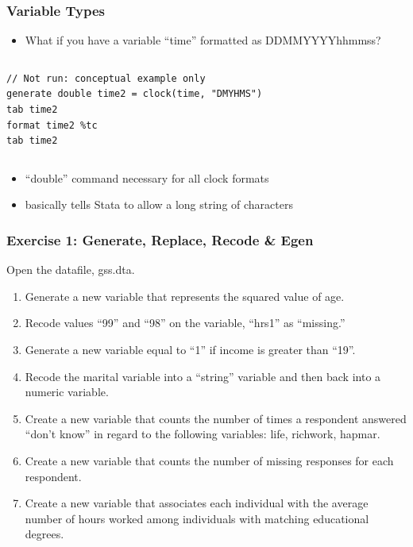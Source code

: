 \documentclass[table]{beamer}
\begin{document}
\begin{frame}[fragile]
\frametitle{Variable Types}
\label{sec-5-8}

\begin{itemize}
\item What if you have a variable ``time'' formatted as DDMMYYYYhhmmss?
\end{itemize}
\vspace{-.5em} \begin{columns}  \begin{block}{}

\begin{verbatim}
// Not run: conceptual example only
generate double time2 = clock(time, "DMYHMS")
tab time2
format time2 %tc
tab time2
\end{verbatim}
\end{block} \end{columns}

\begin{itemize}
\item ``double'' command necessary for all clock formats
\item basically tells Stata to allow a long string of
     characters
\end{itemize}
\end{frame}
\begin{frame}
\frametitle{Exercise 1: Generate, Replace, Recode \& Egen}
\label{sec-5-9}

Open the datafile, gss.dta.
\begin{enumerate}
\item Generate a new variable that represents the squared value of age.
\item Recode values ``99'' and ``98'' on the variable, ``hrs1''  as ``missing.''
\item Generate a new variable equal to ``1'' if income is greater than ``19''.
\item Recode the marital variable into a ``string'' variable and then back into a numeric variable.
\item Create a new variable that counts the number of times a respondent answered ``don't know'' in regard to the following variables: life, richwork, hapmar.
\item Create a new variable that counts the number of missing responses for each respondent.
\item Create a new variable that associates each individual with the average number of hours worked among individuals with matching educational degrees.
\end{enumerate}
\end{frame}
\end{document}
